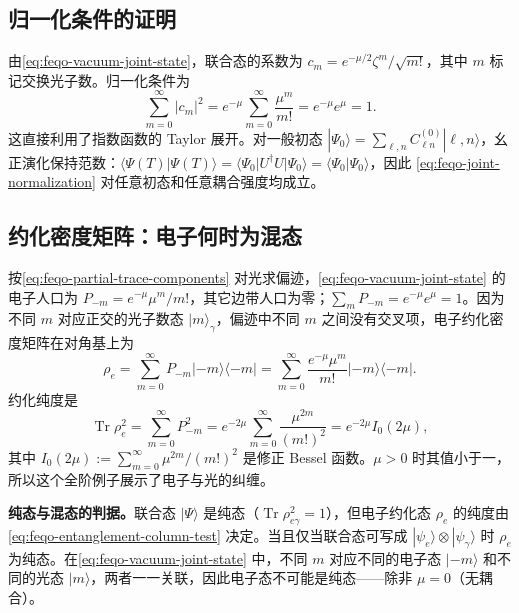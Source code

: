 \subsection{归一化条件的证明}

由\cref{eq:feqo-vacuum-joint-state}，联合态的系数为 \(c_m=e^{-\mu/2}\zeta^m/\sqrt{m!}\)，其中 \(m\) 标记交换光子数。归一化条件为
\begin{equation}
\sum_{m=0}^\infty|c_m|^2
=e^{-\mu}\sum_{m=0}^\infty\frac{\mu^m}{m!}
=e^{-\mu}e^\mu=1.
\label{eq:feqo-joint-normalization}
\end{equation}
这直接利用了指数函数的 Taylor 展开。对一般初态 \(|\Psi_0\rangle=\sum_{\ell,n}C^{(0)}_{\ell n}|\ell,n\rangle\)，幺正演化保持范数：\(\langle\Psi(T)|\Psi(T)\rangle=\langle\Psi_0|U^\dagger U|\Psi_0\rangle=\langle\Psi_0|\Psi_0\rangle\)，因此 \cref{eq:feqo-joint-normalization} 对任意初态和任意耦合强度均成立。

\subsection{约化密度矩阵：电子何时为混态}

按\cref{eq:feqo-partial-trace-components} 对光求偏迹，\cref{eq:feqo-vacuum-joint-state} 的电子人口为 \(P_{-m}=e^{-\mu}\mu^m/m!\)，其它边带人口为零；\(\sum_mP_{-m}=e^{-\mu}e^\mu=1\)。因为不同 \(m\) 对应正交的光子数态 \(|m\rangle_\gamma\)，偏迹中不同 \(m\) 之间没有交叉项，电子约化密度矩阵在对角基上为
\begin{equation}
\rho_e=\sum_{m=0}^\infty P_{-m}|-m\rangle\langle -m|
=\sum_{m=0}^\infty\frac{e^{-\mu}\mu^m}{m!}|-m\rangle\langle -m|.
\label{eq:feqo-vacuum-reduced-electron}
\end{equation}
约化纯度是
\begin{equation}
\operatorname{Tr}\rho_e^2
=\sum_{m=0}^\infty P_{-m}^2
=e^{-2\mu}\sum_{m=0}^\infty\frac{\mu^{2m}}{(m!)^2}
=e^{-2\mu}I_0(2\mu),
\label{eq:feqo-vacuum-purity}
\end{equation}
其中 \(I_0(2\mu):=\sum_{m=0}^\infty\mu^{2m}/(m!)^2\) 是修正 Bessel 函数。\(\mu>0\) 时其值小于一，所以这个全阶例子展示了电子与光的纠缠。

\textbf{纯态与混态的判据。}联合态 \(|\Psi\rangle\) 是纯态（\(\operatorname{Tr}\rho_{e\gamma}^2=1\)），但电子约化态 \(\rho_e\) 的纯度由\cref{eq:feqo-entanglement-column-test} 决定。当且仅当联合态可写成 \(|\psi_e\rangle\otimes|\psi_\gamma\rangle\) 时 \(\rho_e\) 为纯态。在\cref{eq:feqo-vacuum-joint-state} 中，不同 \(m\) 对应不同的电子态 \(|-m\rangle\) 和不同的光态 \(|m\rangle\)，两者一一关联，因此电子态不可能是纯态——除非 \(\mu=0\)（无耦合）。

